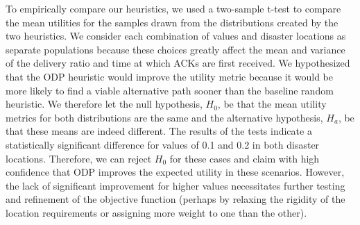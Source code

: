 \documentclass[conference]{IEEEtran}
\begin{document}

To empirically compare our heuristics, we used a two-sample t-test to compare the mean utilities for the \numruns samples drawn from the distributions created by the two heuristics.
We consider each combination of \pfail values and disaster locations %
as separate populations because these choices greatly affect the mean and variance of the delivery ratio and time at which ACKs are first received.
We hypothesized that the ODP heuristic would improve the utility metric because it would be more likely to find a viable alternative path sooner than the baseline random heuristic.
We therefore let the null hypothesis, $H_0$, be that the mean utility metrics for both distributions are the same and the alternative hypothesis, $H_a$, be that these means are indeed different.
The results of the tests indicate a statistically significant difference for \pfail values of 0.1 and 0.2 in both disaster locations.
Therefore, we can reject $H_0$ for these cases and claim with high confidence that ODP improves the expected utility in these scenarios.
However, the lack of significant improvement for higher \pfail values %
necessitates further testing and refinement of the objective function (perhaps by relaxing the rigidity of the location requirements or assigning more weight to one than the other).
\end{document}
